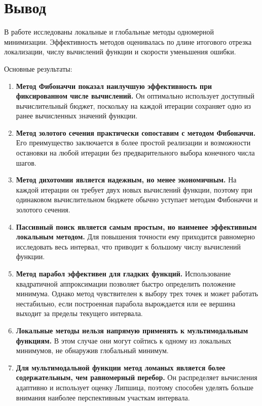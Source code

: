 \section{Вывод}

В работе исследованы локальные и глобальные методы одномерной минимизации.
Эффективность методов оценивалась по длине итогового отрезка локализации,
числу вычислений функции и скорости уменьшения ошибки.

Основные результаты:

\begin{enumerate}
    \item \textbf{Метод Фибоначчи показал наилучшую эффективность при
    фиксированном числе вычислений.} Он оптимально использует доступный
    вычислительный бюджет, поскольку на каждой итерации сохраняет одно из
    ранее вычисленных значений функции.

    \item \textbf{Метод золотого сечения практически сопоставим с методом
    Фибоначчи.} Его преимущество заключается в более простой реализации и
    возможности остановки на любой итерации без предварительного выбора
    конечного числа шагов.

    \item \textbf{Метод дихотомии является надежным, но менее экономичным.}
    На каждой итерации он требует двух новых вычислений функции, поэтому при
    одинаковом вычислительном бюджете обычно уступает методам Фибоначчи и
    золотого сечения.

    \item \textbf{Пассивный поиск является самым простым, но наименее
    эффективным локальным методом.} Для повышения точности ему приходится
    равномерно исследовать весь интервал, что приводит к большому числу
    вычислений функции.

    \item \textbf{Метод парабол эффективен для гладких функций.} Использование
    квадратичной аппроксимации позволяет быстро определить положение минимума.
    Однако метод чувствителен к выбору трех точек и может работать нестабильно,
    если построенная парабола вырождается или ее вершина выходит за пределы
    текущего интервала.

    \item \textbf{Локальные методы нельзя напрямую применять к
    мультимодальным функциям.} В этом случае они могут сойтись к одному из
    локальных минимумов, не обнаружив глобальный минимум.

    \item \textbf{Для мультимодальной функции метод ломаных является более
    содержательным, чем равномерный перебор.} Он распределяет вычисления
    адаптивно и использует оценку Липшица, поэтому способен уделять больше
    внимания наиболее перспективным участкам интервала.


\end{enumerate}
